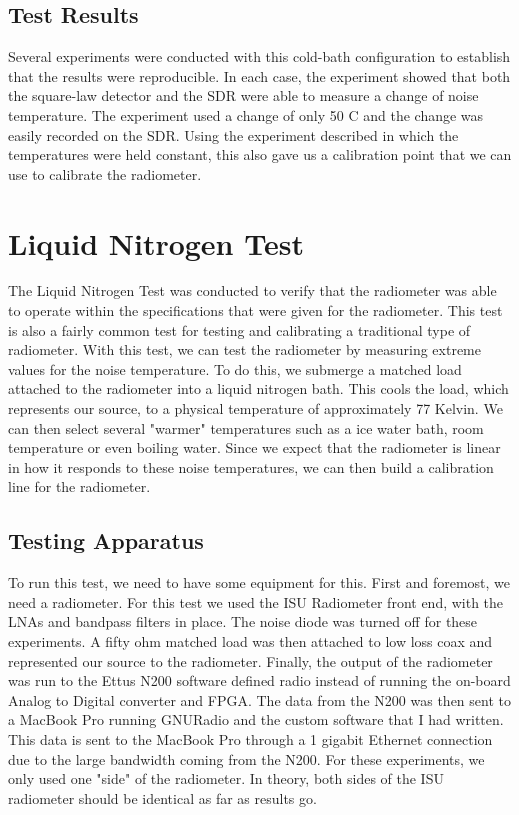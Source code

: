 \subsection{Test Results}

Several experiments were conducted with this cold-bath configuration to establish that the results were reproducible.  In each case, the experiment showed that both the square-law detector and the SDR were able to measure a change of noise temperature.  The experiment used a change of only 50 C and the change was easily recorded on the SDR.  Using the experiment described in which the temperatures were held constant, this also gave us a calibration point that we can use to calibrate the radiometer.

\section{Liquid Nitrogen Test}
The Liquid Nitrogen Test was conducted to verify that the radiometer was able to operate within the specifications that were given for the radiometer.  This test is also a fairly common test for testing and calibrating a traditional type of radiometer.  With this test, we can test the radiometer by measuring extreme values for the noise temperature.  To do this, we submerge a matched load attached to the radiometer into a liquid nitrogen bath.  This cools the load, which represents our source, to a physical temperature of approximately 77 Kelvin.  We can then select several "warmer" temperatures such as a ice water bath, room temperature or even boiling water.  Since we expect that the radiometer is linear in how it responds to these noise temperatures, we can then build a calibration line for the radiometer.

\subsection{Testing Apparatus}
To run this test, we need to have some equipment for this.  First and foremost, we need a radiometer.  For this test we used the ISU Radiometer front end, with the LNAs and bandpass filters in place.  The noise diode was turned off for these experiments.  A fifty ohm matched load was then attached to low loss coax and represented our source to the radiometer.  Finally, the output of the radiometer was run to the Ettus N200 software defined radio instead of running the on-board Analog to Digital converter and FPGA.  The data from the N200 was then sent to a MacBook Pro running GNURadio and the custom software that I had written.  This data is sent to the MacBook Pro through a 1 gigabit Ethernet connection due to the large bandwidth coming from the N200.  For these experiments, we only used one "side" of the radiometer.  In theory, both sides of the ISU radiometer should be identical as far as results go.
